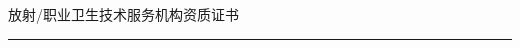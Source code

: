 \clearpage
\thispagestyle{empty}
\centering
\vspace*{20mm}
{\heiti 放射/职业卫生技术服务机构资质证书}\\[10mm]
\rule{120mm}{80mm}
